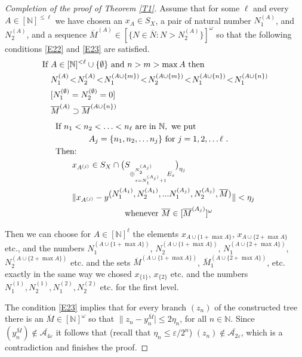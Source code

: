 \documentclass[11pt,leqno]{amsart}
\theoremstyle{definition}
\newcommand{\vp}{\varepsilon}
\newcommand{\cA}{\mathcal{A}}
\newcommand{\N}{\mathbb{N}}
\newcommand{\bN}{\overline{N}}
\newcommand{\bM}{\overline{M}}
\begin{document}
\begin{proof}[Completion of the proof of Theorem \ref{T1}]
Assume that for some $\ell$ and every $A\in[\N]^{\le\ell}$ we have chosen an
$x_A\in S_X$, a pair of natural number $N_1^{(A)}$, 
and $N_2^{(A)}$, and a sequence
$\bM^{(A)}\in[\{N\in\bN: N>N_2^{(A)}\}]^\omega$ so that the 
following conditions \eqref{E22} and  \eqref{E23} are satisfied.
\begin{align}\label{E22}
&\text{If } A\in[\N]^{<\ell}\cup\{\emptyset\} \text{ and } n>m>\max A \text { then }\\
&\quad N_1^{(A)}\!<\!N_2^{(A)}\!<\!N_1^{(A\cup\{m\})}\!<\!N_2^{(A\cup\{m\})}\!<\!N_1^{(A\cup\{n\})}\!<\!N_1^{(A\cup\{n\})}\notag\\
&\quad[N_1^{(\emptyset)}=N_2^{(\emptyset)}=0]\notag\\
&\quad \bM^{(A)} \supset \bM^{(A\cup\{n\})}\notag
\end{align}
\begin{align}\label{E23}
&\text{If }n_1<n_2<\ldots<n_\ell \text{ are in }\N, \text{ we put }\\
&\qquad\qquad A_j=\{n_1,n_2,\ldots n_j\} \text{ for }j=1,2,\ldots\ell\ .
\notag\\ 
&\text{Then:}\notag\\     
&\qquad x_{A^{(j)}}\in S_X\cap \bigl(S_{\oplus_{s=N_1^{(A_j)}+1}^{N_2^{(A_j)}} 
E_s}\bigr)_{\eta_j}\notag\\
&\qquad\| x_{A^{(j)}}-y^{\displaystyle(N_1^{(A_1)},N_2^{(A_1)},...N_1^{(A_j)},
N_2^{(A_j)},\bM)}\|<\eta_j  \notag\\
& \qquad\qquad\qquad\qquad\text{ whenever }\bM\in[\bM^{(A_j)}]^\omega\notag
\end{align}

Then we can choose for $A\in[\N]^{\ell}$ the elements $x_{A\cup\{1+\max A\}}$, 
$x_{A\cup\{2+\max A\}}$ etc., and the numbers $N_1^{(A\cup\{1+\max A\})}$,
 $N_2^{(A\cup\{1+\max A\})}$,
 $N_1^{(A\cup\{2+\max A\})}$,
 $N_2^{(A\cup\{2+\max A\})}$ etc. and the  sets  $\bM^{(A\cup\{1+\max A\})}$,
 $\bM_1^{(A\cup\{2+\max A\})}$, etc. exactly in the same way we chosed
$x_{\{1\}}$, $x_{\{2\}}$ etc. and the numbers
 $N^{(1)}_1,N^{(1)}_2,N^{(2)}_1,N^{(2)}_2$ etc. for the first level. 

The condition \eqref{E23} implies that for every branch $(z_n)$ of 
the constructed tree there is an $\bM\in[\N]^\omega$ so that 
$\|z_n- y^{\bM}_n|\le 2\eta_n$, for all $n\in\N$.
Since $(y^{\bM}_n)\not\in\overline{\cA_{4\vp}}$ it follows that 
(recall that $\eta_n\le\vp/2^n$) $(z_n)\not\in\overline{\cA_{2\vp}}$, 
which is a contradiction and finishes the proof.
\end{proof}
\end{document}
